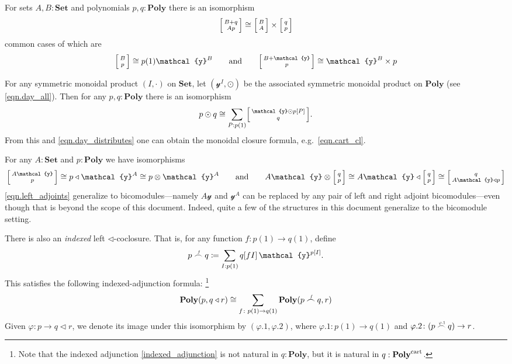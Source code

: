 \documentclass[11pt, one side, article]{memoir}
\makeatletter
\theoremstyle{definition}
\theoremstyle{plain}
\newcommand{\Cat}[1]{\mathbf{#1}}%
\newcommand{\tn}[1]{\textnormal{#1}}
\newcommand{\smset}{\Cat{Set}}
\newcommand{\yon}{{\mathcal{y}}}
\newcommand{\poly}{\Cat{Poly}}
\newcommand{\polycart}{\poly^{\tn{cart}}}
\newcommand{\0}{\textsf{0}}
\newcommand{\1}{\tn{\textsf{1}}}
\newcommand{\tri}{\mathbin{\triangleleft}}
\newcommand{\biglens}[2]{
     \begin{bmatrix}{\vphantom{f_f^f}#2} \\ {\vphantom{f_f^f}#1} \end{bmatrix}
}
\newcommand{\littlelens}[2]{
     \begin{bsmallmatrix}{\vphantom{f}#2} \\ {\vphantom{f}#1} \end{bsmallmatrix}
}
\newcommand{\lens}[2]{
  \relax\if@display
     \biglens{#1}{#2}
  \else
     \littlelens{#1}{#2}
  \fi
}
\newcommand{\indexcoclscale}[1]{\scalebox{.7}{#1}}
\newcommand{\cocl}[1]{
	\scriptsize\overset{\,\indexcoclscale{$#1$}}{\frown}\normalsize
}
\newcommand{\hh}[2][]{#1 \tn{#2} #1}
\newcommand{\qqand}{\hh[\qquad]{and}}
\makeatother
\begin{document}
For sets $A,B:\smset$ and polynomials $p,q:\poly$ there is an isomorphism
\begin{equation}
	\lens{Ap}{B+q}\cong\lens{A}{B}\times\lens{p}{q}
\end{equation}
common cases of which are
\begin{equation}
	\lens{p}{B}\cong p(1)\yon^B
	\qqand
	\lens{p}{B+\yon}\cong\yon^B\times p
\end{equation}

For any symmetric monoidal product $(I,\cdot)$ on $\smset$, let $(\yon^I,\odot)$ be the associated symmetric monoidal product on $\poly$ (see \cref{eqn.day_all}). Then for any $p,q:\poly$ there is an isomorphism
\begin{equation}
	p\odot q\cong\sum_{P:p(1)}\lens{q}{\yon\odot p[P]}.
\end{equation}
From this and \eqref{eqn.day_distributes} one can obtain the monoidal closure formula, e.g.\ \eqref{eqn.cart_cl}.


For any $A:\smset$ and $p:\poly$ we have isomorphisms
\begin{equation}\label{eqn.left_adjoints}
  \lens{p}{A\yon}\cong 
  p\tri\yon^A\cong 
  p\otimes\yon^A
  \qqand
  A\yon\otimes\lens{p}{q}\cong
  A\yon\tri\lens{p}{q}\cong
	\lens{A\yon\tri p}{q}
\end{equation}
\cref{eqn.left_adjoints} generalize to bicomodules---namely $A\yon$ and $\yon^A$ can be replaced by any pair of left and right adjoint bicomodules---even though that is beyond the scope of this document. Indeed, quite a few of the structures in this document generalize to the bicomodule setting.

There is also an \emph{indexed} left $\tri$-coclosure. That is, for any function $f\colon p(1)\to q(1)$, define
\begin{equation}
	p\cocl{f}q\coloneqq \sum_{I: p(1)}q[fI]\,\yon^{p[I]}.
\end{equation}
This satisfies the following indexed-adjunction formula:%
\footnote{Note that the indexed adjunction \eqref{indexed_adjunction} is not natural in $q:\poly$, but it is natural in $q:\polycart$.}
\begin{equation}\label{indexed_adjunction}
	\poly(p,q\tri r)\cong\sum_{f\colon p(1)\to q(1)}\poly(p\cocl{f}q,r)
\end{equation}
Given $\varphi\colon p\to q\tri r$, we denote its image under this isomorphism by $(\varphi.1,\varphi.2)$, where $\varphi.1\colon p(1)\to q(1)$ and $\varphi.2\colon (p\cocl{\varphi.1}q)\to r$.
\end{document}
